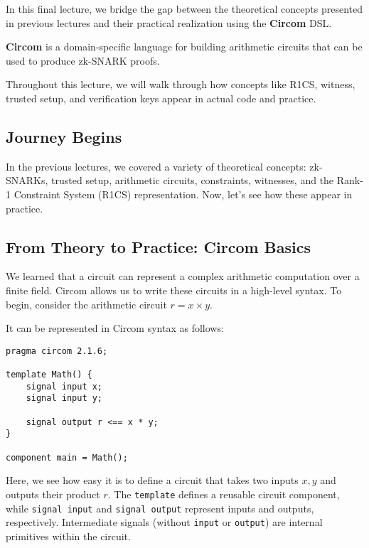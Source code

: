 \documentclass[../lecture-notes-148x210.tex]{subfiles}
\begin{document}
In this final lecture, we bridge the gap between the theoretical concepts presented in previous lectures and their practical realization using the \textbf{Circom} DSL.

\begin{definition}
    \textbf{Circom} is a domain-specific language for building arithmetic circuits that can be used to produce zk-SNARK proofs.
\end{definition}

Throughout this lecture, we will walk through how concepts like R1CS, witness, trusted setup, and verification keys appear in actual code and practice.

\subsection{Journey Begins}

In the previous lectures, we covered a variety of theoretical concepts: zk-SNARKs, trusted setup, arithmetic circuits, constraints, witnesses, and the Rank-1 Constraint System (R1CS) representation.
Now, let's see how these appear in practice.

\subsection{From Theory to Practice: Circom Basics}

We learned that a circuit can represent a complex arithmetic computation over a finite field.
Circom allows us to write these circuits in a high-level syntax.
To begin, consider the arithmetic circuit $r = x \times y$.

It can be represented in Circom syntax as follows:

\begin{lstlisting}[language=Circom]
pragma circom 2.1.6;

template Math() {
    signal input x;
    signal input y;

    signal output r <== x * y;
}

component main = Math();
\end{lstlisting}

Here, we see how easy it is to define a circuit that takes two inputs $x,y$ and outputs their product $r$.
The \texttt{template} defines a reusable circuit component, while \texttt{signal input} and \texttt{signal output} represent inputs and outputs, respectively.
Intermediate signals (without \texttt{input} or \texttt{output}) are internal primitives within the circuit.
\end{document}
